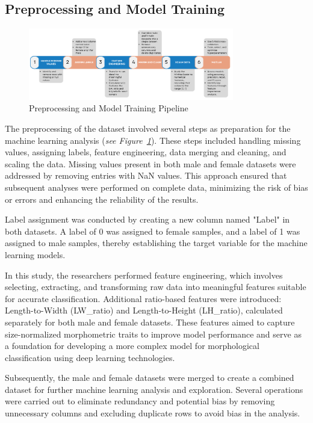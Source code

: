 \subsection{Preprocessing and Model Training}
\label{sec:pre-processing}

\begin{figure}[!htbp]
	\centering
	\includegraphics[width=0.8\textwidth]{figures/pipeline.png}
	\caption{Preprocessing and Model Training Pipeline}
	\label{fig: pipeline}
\end{figure}

The preprocessing of the dataset involved several steps as preparation for the machine learning analysis (\textit{see Figure~\ref{fig: pipeline}}). These steps included handling missing values, assigning labels, feature engineering, data merging and cleaning, and scaling the data. Missing values present in both male and female datasets were addressed by removing entries with NaN values. This approach ensured that subsequent analyses were performed on complete data, minimizing the risk of bias or errors and enhancing the reliability of the results.

Label assignment was conducted by creating a new column named "Label" in both datasets. A label of 0 was assigned to female samples, and a label of 1 was assigned to male samples, thereby establishing the target variable for the machine learning models.

In this study, the researchers performed feature engineering, which involves selecting, extracting, and transforming raw data into meaningful features suitable for accurate classification. Additional ratio-based features were introduced: Length-to-Width (LW\_ratio) and Length-to-Height (LH\_ratio), calculated separately for both male and female datasets. These features aimed to capture size-normalized morphometric traits to improve model performance and serve as a foundation for developing a more complex model for morphological classification using deep learning technologies.

Subsequently, the male and female datasets were merged to create a combined dataset for further machine learning analysis and exploration. Several operations were carried out to eliminate redundancy and potential bias by removing unnecessary columns and excluding duplicate rows to avoid bias in the analysis.


